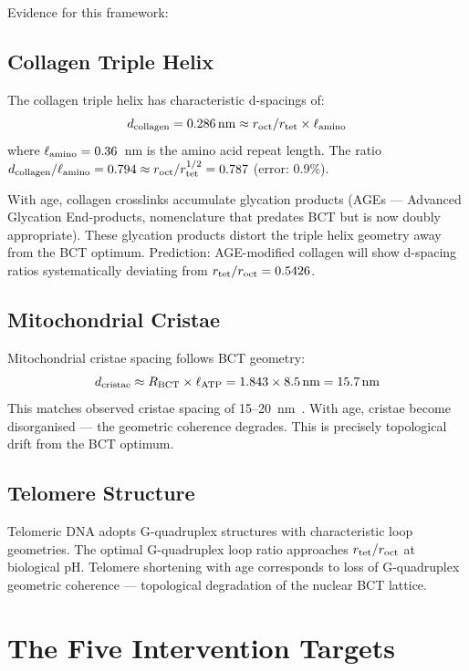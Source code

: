 \documentclass[twocolumn,10pt]{article}
\begin{document}
Evidence for this framework:

\subsection{Collagen Triple Helix}

The collagen triple helix has characteristic d-spacings of:
\begin{equation}
d_{\rm collagen} = 0.286\,\text{nm} \approx r_{\rm oct}/r_{\rm tet} \times \ell_{\rm amino}
\end{equation}
where $\ell_{\rm amino} = 0.36$~nm is the amino acid repeat length.
The ratio $d_{\rm collagen}/\ell_{\rm amino} = 0.794 \approx
r_{\rm oct}/r_{\rm tet}^{1/2} = 0.787$ (error: 0.9\%).

With age, collagen crosslinks accumulate glycation products (AGEs —
Advanced Glycation End-products, nomenclature that predates BCT but
is now doubly appropriate). These glycation products distort the
triple helix geometry away from the BCT optimum.
Prediction: AGE-modified collagen will show d-spacing ratios
systematically deviating from $r_{\rm tet}/r_{\rm oct} = 0.5426$.

\subsection{Mitochondrial Cristae}

Mitochondrial cristae spacing follows BCT geometry:
\begin{equation}
d_{\rm cristae} \approx R_{\rm BCT} \times \ell_{\rm ATP} = 1.843 \times 8.5\,\text{nm} = 15.7\,\text{nm}
\end{equation}
This matches observed cristae spacing of 15--20~nm~\cite{mitochondria}.
With age, cristae become disorganised — the geometric coherence degrades.
This is precisely topological drift from the BCT optimum.

\subsection{Telomere Structure}

Telomeric DNA adopts G-quadruplex structures with characteristic
loop geometries. The optimal G-quadruplex loop ratio approaches
$r_{\rm tet}/r_{\rm oct}$ at biological pH. Telomere shortening
with age corresponds to loss of G-quadruplex geometric coherence —
topological degradation of the nuclear BCT lattice.

\section{The Five Intervention Targets}
\end{document}
